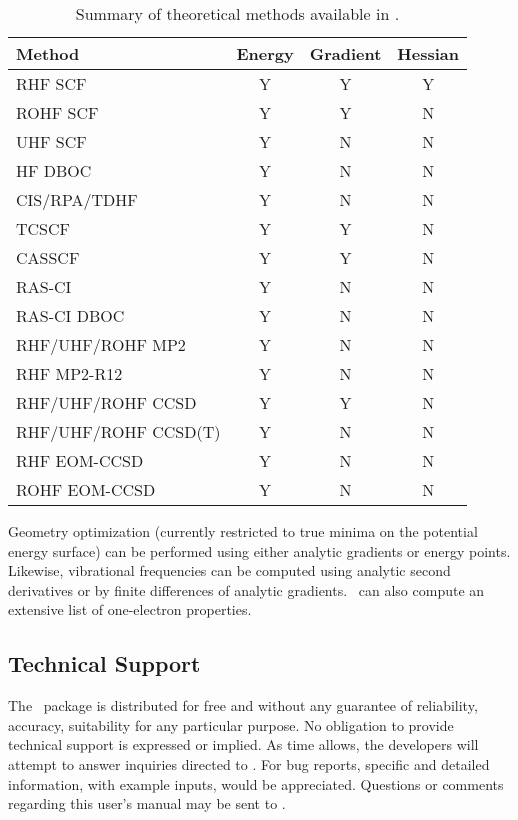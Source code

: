 \begin{table}
\caption{Summary of theoretical methods available in \PSIthree.} \label{table:methods}
\parsep 10pt
\begin{center}
\begin{tabular}{lccc} \hline\hline
Method           & Energy & Gradient & Hessian \\ \hline
RHF SCF          & Y & Y & Y \\
ROHF SCF         & Y & Y & N \\
UHF SCF          & Y & N & N \\
HF DBOC          & Y & N & N \\
CIS/RPA/TDHF     & Y & N & N \\
TCSCF            & Y & Y & N \\
CASSCF           & Y & Y & N \\
RAS-CI           & Y & N & N \\
RAS-CI DBOC      & Y & N & N \\
RHF/UHF/ROHF MP2     & Y & N & N \\
RHF MP2-R12      & Y & N & N \\
RHF/UHF/ROHF CCSD    & Y & Y & N \\
RHF/UHF/ROHF CCSD(T) & Y & N & N \\
RHF EOM-CCSD     & Y & N & N \\
ROHF EOM-CCSD    & Y & N & N \\
\hline\hline
\end{tabular}
\end{center}
\end{table}
Geometry optimization (currently restricted to true minima on the potential
energy surface) can be performed using either analytic gradients
or energy points.  Likewise, vibrational frequencies can be 
computed using analytic second derivatives or by finite
differences of analytic gradients.
\PSIthree\ can also compute an extensive list of one-electron properties.

\subsection{Technical Support} The \PSIthree\ package is
distributed for free and without any guarantee of reliability,
accuracy, suitability for any particular purpose.  No obligation
to provide technical support is expressed or implied.  As time
allows, the developers will attempt to answer inquiries directed to
.
For bug reports, specific and detailed information, with example
inputs, would be appreciated.  Questions or comments regarding
this user's manual may be sent to .



